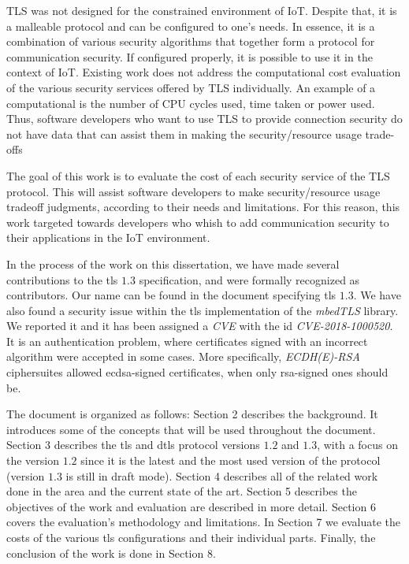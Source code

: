 \documentclass{llncs}
\begin{document}
TLS was not designed for the constrained environment of IoT. Despite that,
it is a malleable protocol and can be configured to one's needs. In essence,
it is a combination of various security algorithms that together form
a protocol for communication security. If configured
properly, it is possible to use it in the context of IoT. Existing work
does not address the computational cost evaluation of the various security services
offered by TLS individually. An example of a computational is the number of CPU
cycles used, time taken or power used. Thus, software developers
who want to use TLS to provide connection security do not have data that can
assist them in making the security/resource usage trade-offs

The goal of this work is to evaluate the cost of each security service of the
TLS protocol. This will assist software developers to make security/resource usage
tradeoff judgments, according to their needs and limitations. For this reason,
this work targeted towards developers who whish to add communication security
to their applications in the IoT environment.

In the process of the work on this dissertation, we have made several
contributions to the \gls{tls} $1.3$ specification, and were formally recognized as 
contributors\cite{Mergepul65:online}. Our name can be found in the document specifying \gls{tls} $1.3$\cite{RFC8446}.
We have also found a security issue within the
\gls{tls} implementation of the \textit{mbedTLS} library. We reported it and it
has been assigned a \textit{CVE} with the id \textit{CVE-2018-1000520}\cite{NVDCVE2094:online}.
It is an authentication problem, where certificates signed with an incorrect algorithm
were accepted in some cases. More specifically, \textit{ECDH(E)-RSA} ciphersuites allowed \gls{ecdsa}-signed
certificates, when only \gls{rsa}-signed ones should be.

The document is organized as follows: Section 2 describes the background. It
introduces some of the concepts that will be used throughout
the document. Section 3 describes the \gls{tls} and \gls{dtls} protocol
versions $1.2$ and $1.3$, with a focus on the version $1.2$ since
it is the latest and the most used version of the protocol (version $1.3$ is still in
draft mode). Section 4 describes all of the related work done in the area and
the current state of the art. Section 5 describes the objectives of the work and evaluation 
are described in more detail. 
Section 6
covers the evaluation's methodology and limitations. In Section 7 we evaluate the costs of the various \gls{tls}
configurations and their individual parts. Finally, the conclusion of the work is done in Section 8.
\end{document}

